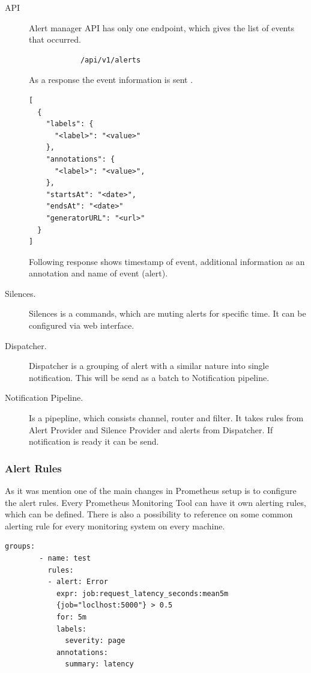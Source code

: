 \begin{description}
\item[API] Alert manager API has only one endpoint, which gives the list of events that occurred.
\begin{lstlisting}
            /api/v1/alerts
\end{lstlisting}

As a response the event information is sent \cite{alert_send}.
 \begin{lstlisting}[caption=Querying alert]
 [
  {
    "labels": {
      "<label>": "<value>"
    },
    "annotations": {
      "<label>": "<value>",
    },
    "startsAt": "<date>",
    "endsAt": "<date>"
    "generatorURL": "<url>"
  }
]
\end{lstlisting}
Following response shows timestamp of event, additional information as an annotation and name of event (alert). 
\item[Silences.] Silences is a commands, which are muting alerts for specific time. It can be configured via web interface. 
\item[Dispatcher.] Dispatcher is a grouping of alert with a similar nature into single notification. This will be send as a batch to Notification pipeline.
\item[Notification Pipeline.] Is a pipepline, which consists channel, router and filter. It takes rules from Alert Provider and Silence Provider and alerts from Dispatcher. If notification is ready it can be send. 
\end{description}


\subsubsection{Alert Rules}\label{Alert Rules}

As it was mention one of the main changes in Prometheus setup is to configure the alert rules. Every Prometheus Monitoring Tool can have it own alerting rules, which can be defined. There is also a possibility to reference on some common alerting rule for every monitoring system on every machine. 

 \begin{lstlisting}[caption=Alert error response]
        groups:
        - name: test
          rules:
          - alert: Error
            expr: job:request_latency_seconds:mean5m
            {job="loclhost:5000"} > 0.5
            for: 5m
            labels:
              severity: page
            annotations:
              summary: latency
\end{lstlisting}

